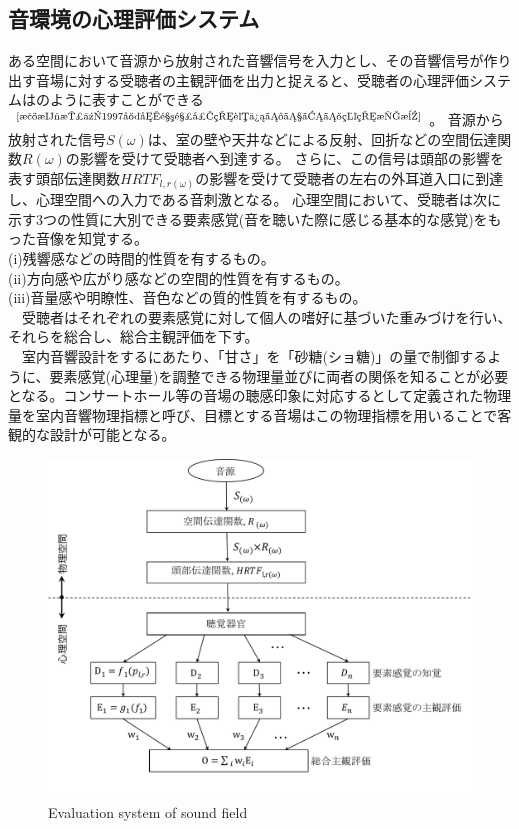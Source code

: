 \subsection{音環境の心理評価システム}
ある空間において音源から放射された音響信号を入力とし、その音響信号が作り出す音場に対する受聴者の主観評価を出力と捉えると、受聴者の心理評価システムはのように表すことができる$^{\text{\cite{森本政之1997室内音響心理評価のための物理指標}}}$。
音源から放射された信号$S(\omega)$は、室の壁や天井などによる反射、回折などの空間伝達関数$R(\omega)$の影響を受けて受聴者へ到達する。
さらに、この信号は頭部の影響を表す頭部伝達関数$HRTF_{l,r(\omega)}$の影響を受けて受聴者の左右の外耳道入口に到達し、心理空間への入力である音刺激となる。
心理空間において、受聴者は次に示す3つの性質に大別できる要素感覚(音を聴いた際に感じる基本的な感覚)をもった音像を知覚する。
\\(i)残響感などの時間的性質を有するもの。
\\(i\hspace{-.05em}i)方向感や広がり感などの空間的性質を有するもの。
\\(i\hspace{-.05em}i\hspace{-.05em}i)音量感や明瞭性、音色などの質的性質を有するもの。
\\　受聴者はそれぞれの要素感覚に対して個人の嗜好に基づいた重みづけを行い、それらを総合し、総合主観評価を下す。
\\　室内音響設計をするにあたり、「甘さ」を「砂糖(ショ糖)」の量で制御するように、要素感覚(心理量)を調整できる物理量並びに両者の関係を知ることが必要となる。コンサートホール等の音場の聴感印象に対応するとして定義された物理量を室内音響物理指標と呼び、目標とする音場はこの物理指標を用いることで客観的な設計が可能となる。\\

\begin{figure}[htbp]
    \centering
    \includegraphics[keepaspectratio,scale=0.5]{01_att/phyco.pdf}
    \caption{\hspace{1mm}Evaluation system of sound field}
    \label{fig:室内音響心理評価システム}
\end{figure}


